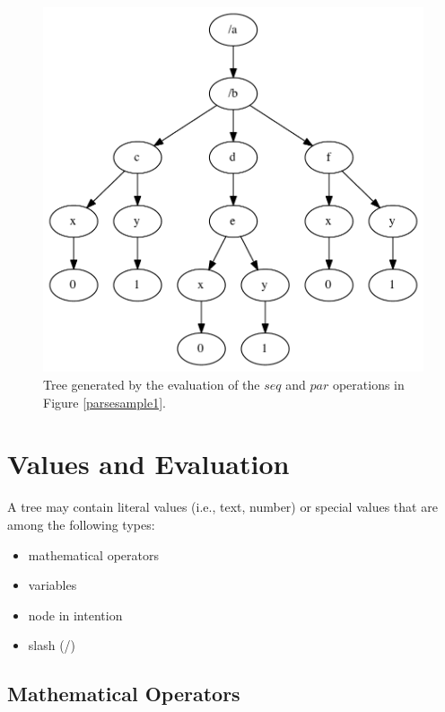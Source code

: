 \documentclass{article}
\begin{document}
\begin{figure}[htbp]
\begin{center}
\includegraphics[width=0.8\columnwidth]{eval/sample1}
\caption{Tree generated by the evaluation of the $seq$ and $par$ operations in Figure \ref{parsesample1}.}
\label{treesample1}
\end{center}
\end{figure}



\section{Values and Evaluation}\label{sec:valeurs}

A tree may contain literal values (i.e., text, number) or special values that are among the following types:
\begin{itemize}
 \setlength\itemsep{0.0em}
\item mathematical operators
\item variables
\item node in intention
\item slash (/)
\end{itemize}



\subsection{Mathematical Operators}
\end{document}
